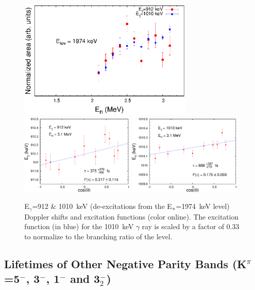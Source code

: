 \begin{figure}[h!]
\begin{center}
\includegraphics[width=0.75\textwidth]{1974_ExF.eps}\\
\includegraphics[width=0.49\textwidth]{912_DSAM.eps}
\includegraphics[width=0.49\textwidth]{1010_DSAM.eps}

\caption{E$_\gamma$=912 \& 1010~keV (de-excitations from the E$_{\rm x}$=1974~keV level) Doppler shifts and excitation functions (color online). The excitation function (in blue) for the 1010~keV $\gamma$ ray is scaled by a factor of 0.33 to normalize to the branching ratio of the level. \label{fig:1974_DSAM_EXF}}
\end{center}
\end{figure}

\subsection{Lifetimes of Other Negative Parity Bands (K$^\pi$=5$^-$, 3$^-$, 1$^-$ and 3$^-_2$)}

